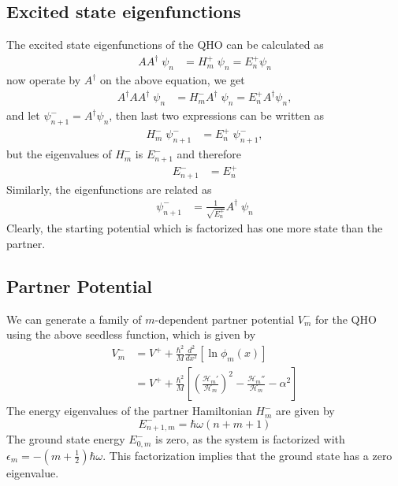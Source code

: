 \documentclass[a4paper, 12pt]{article}
\begin{document}
\subsection*{Excited state eigenfunctions}
The excited state eigenfunctions of the QHO can be calculated as
\begin{align*}
    A A^\dagger\;\psi_{n}&=H^+_m\;\psi_{n}=E_{n}^+\psi_{n}
\end{align*}
now operate by \( A^\dagger \) on the above equation, we get
\begin{align*}
    A^\dagger A A^\dagger\;\psi_{n}&=H^-_m A^\dagger\;\psi_{n}=E_{n}^+ A^\dagger \psi_{n},
\end{align*}
and let \( \psi_{n+1}^- = A^\dagger \psi_{n} \), then last two expressions can be written as
\begin{align*}
    H^-_m\;\psi_{n+1}^-&=E_{n}^+ \;\psi_{n+1}^-,
\end{align*}
but the eigenvalues of \( H^-_m \) is $E^-_{n+1}$ and therefore 
\begin{align*}
    E^-_{n+1}&=E_{n}^+
\end{align*}
Similarly, the eigenfunctions are related as
\begin{align*}
    \psi_{n+1}^-&=\frac{1}{\sqrt{E_{n}^+}}A^\dagger\;\psi_{n}
\end{align*}
Clearly, the starting potential which is factorized has one more state than the partner.
\subsection{Partner Potential}
We can generate a family of $m$-dependent partner potential \( V^-_m \) for the QHO using the above seedless function, which is given by
\begin{align}
V^-_m &= V^+ + \frac{\hbar^2}{M} \frac{d^2}{dx^2}\left[\ln\phi_m(x)\right]\\
&=V^+ +\frac{\hbar^2}{M}\left[\left(\frac{\mathcal{H}_m'}{\mathcal{H}_m}\right)^2-\frac{\mathcal{H}_m''}{\mathcal{H}_m}-\alpha^2\right]
\end{align}
The energy eigenvalues of the partner Hamiltonian \( H^-_m \) are given by
\begin{equation}
E^-_{n+1,m} = \hbar \omega \left(n+m+1\right)
\end{equation}
The ground state energy $E^-_{0,m}$ is zero, as the system is factorized with $\epsilon_m=-(m+\frac{1}{2})\hbar\omega$. This factorization implies that the ground state has a zero eigenvalue.
\end{document}
